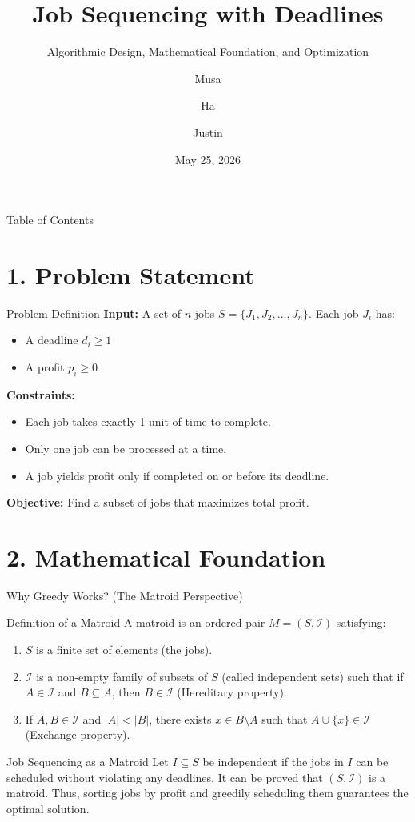 \documentclass[aspectratio=169]{beamer}
\title[Job Sequencing]{Job Sequencing with Deadlines}
\subtitle{Algorithmic Design, Mathematical Foundation, and Optimization}
\author[Group 12]{Musa \and Ha \and Justin}
\institute[YZU]{Yuan Ze University \\ \medskip \textit{Introduction to Algorithms - 114-2}}
\date{May 25, 2026}
\begin{document}
\begin{frame}
    \titlepage
\end{frame}

\begin{frame}{Table of Contents}
    \tableofcontents
\end{frame}

\section{1. Problem Statement}
\begin{frame}{Problem Definition}
    \textbf{Input:} A set of $n$ jobs $S = \{J_1, J_2, \dots, J_n\}$. Each job $J_i$ has:
    \begin{itemize}
        \item A deadline $d_i \ge 1$
        \item A profit $p_i \ge 0$
    \end{itemize}
    \vspace{0.5cm}
    \textbf{Constraints:}
    \begin{itemize}
        \item Each job takes exactly 1 unit of time to complete.
        \item Only one job can be processed at a time.
        \item A job yields profit only if completed on or before its deadline.
    \end{itemize}
    \vspace{0.5cm}
    \textbf{Objective:} Find a subset of jobs that maximizes total profit.
\end{frame}

\section{2. Mathematical Foundation}
\begin{frame}{Why Greedy Works? (The Matroid Perspective)}
    \begin{block}{Definition of a Matroid}
        A matroid is an ordered pair $M = (S, \mathcal{I})$ satisfying:
        \begin{enumerate}
            \item $S$ is a finite set of elements (the jobs).
            \item $\mathcal{I}$ is a non-empty family of subsets of $S$ (called independent sets) such that if $A \in \mathcal{I}$ and $B \subseteq A$, then $B \in \mathcal{I}$ (Hereditary property).
            \item If $A, B \in \mathcal{I}$ and $|A| < |B|$, there exists $x \in B \setminus A$ such that $A \cup \{x\} \in \mathcal{I}$ (Exchange property).
        \end{enumerate}
    \end{block}
    \begin{block}{Job Sequencing as a Matroid}
        Let $I \subseteq S$ be independent if the jobs in $I$ can be scheduled without violating any deadlines. It can be proved that $(S, \mathcal{I})$ is a matroid. Thus, sorting jobs by profit and greedily scheduling them guarantees the optimal solution.
    \end{block}
\end{frame}
\end{document}
